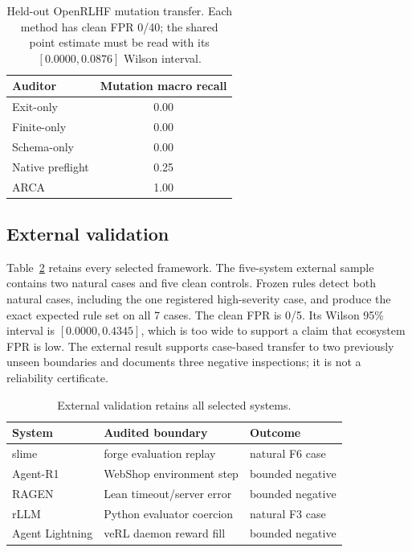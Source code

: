 \documentclass[10pt]{article}
\newcommand{\arca}{\textsc{ARCA}}
\begin{document}
\begin{table}[t]
\centering
\small
\caption{Held-out OpenRLHF mutation transfer.  Each method has clean FPR 0/40;
the shared point estimate must be read with its $[0.0000,0.0876]$ Wilson
interval.}
\label{tab:heldout}
\begin{tabular}{@{}lc@{}}
\toprule
Auditor & Mutation macro recall \\
\midrule
Exit-only & 0.00 \\
Finite-only & 0.00 \\
Schema-only & 0.00 \\
Native preflight & 0.25 \\
\arca{} & 1.00 \\
\bottomrule
\end{tabular}
\end{table}

\subsection{External validation}

Table~\ref{tab:external} retains every selected framework.  The five-system
external sample contains two natural cases and five clean
controls.  Frozen rules detect both natural cases, including the one registered
high-severity case, and produce the exact expected rule set on all 7 cases.
The clean FPR is 0/5.  Its Wilson 95\% interval is
$[0.0000,0.4345]$, which is too wide to support a claim that ecosystem FPR is
low.  The external result supports case-based transfer to two previously
unseen boundaries and documents three negative inspections; it is not a
reliability certificate.

\begin{table}[t]
\centering
\small
\caption{External validation retains all selected systems.}
\label{tab:external}
\begin{tabularx}{\columnwidth}{@{}lXl@{}}
\toprule
System & Audited boundary & Outcome \\
\midrule
slime & forge evaluation replay & natural F6 case \\
Agent-R1 & WebShop environment step & bounded negative \\
RAGEN & Lean timeout/server error & bounded negative \\
rLLM & Python evaluator coercion & natural F3 case \\
Agent Lightning & veRL daemon reward fill & bounded negative \\
\bottomrule
\end{tabularx}
\end{table}
\end{document}
